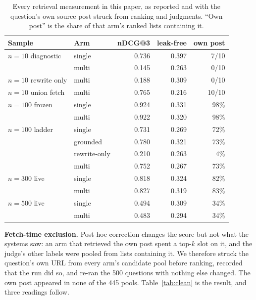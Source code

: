 \documentclass[10pt,conference]{IEEEtran}
\begin{document}
\begin{table}[t]
\caption{Every retrieval measurement in this paper, as reported and with the
question's own source post struck from ranking and judgments. ``Own post'' is the
share of that arm's ranked lists containing it.}
\label{tab:leak}
\centering
\footnotesize
\setlength{\tabcolsep}{3.5pt}
\begin{tabular}{@{}llrrr@{}}
\toprule
Sample & Arm & nDCG@3 & leak-free & own post \\
\midrule
$n{=}10$ diagnostic & single & 0.736 & 0.397 & 7/10 \\
                & multi  & 0.145 & 0.263 & 0/10 \\
$n{=}10$ rewrite only & multi & 0.188 & 0.309 & 0/10 \\
$n{=}10$ union fetch & multi & 0.765 & 0.216 & 10/10 \\
$n{=}100$ frozen & single & 0.924 & 0.331 & 98\% \\
                 & multi  & 0.922 & 0.320 & 98\% \\
$n{=}100$ ladder & single & 0.731 & 0.269 & 72\% \\
                 & grounded & 0.780 & 0.321 & 73\% \\
                 & rewrite-only & 0.210 & 0.263 & 4\% \\
                 & multi & 0.752 & 0.267 & 73\% \\
$n{=}300$ live & single & 0.818 & 0.324 & 82\% \\
               & multi  & 0.827 & 0.319 & 83\% \\
$n{=}500$ live & single & 0.494 & 0.309 & 34\% \\
               & multi  & 0.483 & 0.294 & 34\% \\
\bottomrule
\end{tabular}
\end{table}

\textbf{Fetch-time exclusion.} Post-hoc correction changes the score but not
what the systems saw: an arm that retrieved the own post spent a top-$k$ slot on
it, and the judge's other labels were pooled from lists containing it. We
therefore struck the question's own URL from every arm's candidate pool before
ranking, recorded that the run did so, and re-ran the 500 questions with nothing
else changed. The own post appeared in none of the 445 pools.
Table~\ref{tab:clean} is the result, and three readings follow.
\end{document}
